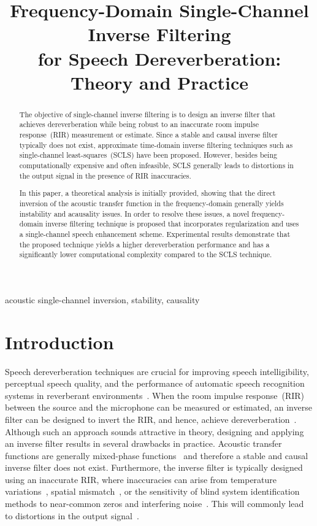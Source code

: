 \documentclass{article}
\title{Frequency-Domain Single-Channel Inverse Filtering \\ for Speech Dereverberation: Theory and Practice}
\def\ninept{\def\baselinestretch{.906}\let\normalsize\small\normalsize}
\begin{document}
\newlength\figureheight
\newlength\figurewidth
\setlength\figureheight{5cm}
\setlength\figurewidth{6.2cm}
\ninept
%
\maketitle
%
\begin{abstract}
The objective of single-channel inverse filtering is to design an inverse filter that achieves dereverberation while being robust to an inaccurate room impulse response~(RIR) measurement or estimate.
Since a stable and causal inverse filter typically does not exist, approximate time-domain inverse filtering techniques such as single-channel least-squares~(SCLS) have been proposed. 
However, besides being computationally expensive and often infeasible, SCLS generally leads to distortions in the output signal in the presence of RIR inaccuracies.

In this paper, a theoretical analysis is initially provided, showing that the direct inversion of the acoustic transfer function in the frequency-domain generally yields instability and acausality issues.
In order to resolve these issues, a novel frequency-domain inverse filtering technique is proposed that incorporates regularization and uses a single-channel speech enhancement scheme. 
Experimental results demonstrate that the proposed technique yields a higher dereverberation performance and has a significantly lower computational complexity compared to the SCLS technique.



\end{abstract}
%
\begin{keywords}
acoustic single-channel inversion, stability, causality
\end{keywords}
%

\section{Introduction}
Speech dereverberation techniques are crucial for improving speech intelligibility, perceptual speech quality, and the performance of automatic speech recognition systems in reverberant environments~\cite{Jeub_ITASP_2010,Maas_ICASSP_2012}.
When the room impulse response~(RIR) between the source and the microphone can be measured or estimated, an inverse filter can be designed to invert the RIR, and hence, achieve dereverberation~\cite{Neely_1979,Mourjopoulos_1982,Jan_ICASSP_96}.
Although such an approach sounds attractive in theory, designing and applying an inverse filter results in several drawbacks in practice. 
Acoustic transfer functions are generally mixed-phase functions~\cite{Neely_1979} and therefore a stable and causal inverse filter does not exist.
Furthermore, the inverse filter is typically designed using an inaccurate RIR, where inaccuracies can arise from temperature variations~\cite{Hikichi_EURASIP_2007}, spatial mismatch~\cite{Radlovic_ITSA_2000}, or the sensitivity of blind system identification methods to near-common zeros and interfering noise~\cite{Hasan_EUSIPCO_2006}.
This will commonly lead to distortions in the output signal~\cite{Radlovic_ITSA_2000}.
\end{document}
